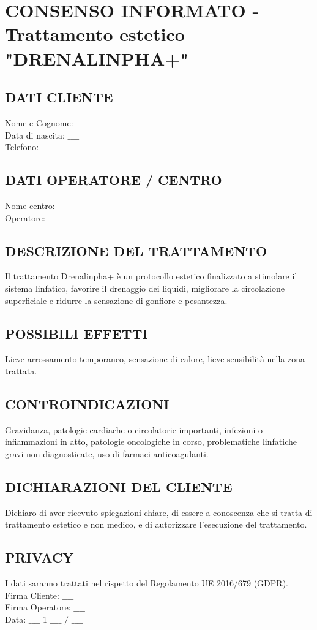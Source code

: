 \newpage

\section{CONSENSO INFORMATO - Trattamento estetico "DRENALINPHA+"}
\subsection{DATI CLIENTE}
\noindent Nome e Cognome: $\_\_\_\_$\\
Data di nascita: $\_\_\_\_$\\
Telefono: $\_\_\_\_$

\subsection{DATI OPERATORE / CENTRO}
\noindent Nome centro: $\_\_\_\_$\\
Operatore: $\_\_\_\_$

\subsection{DESCRIZIONE DEL TRATTAMENTO}
Il trattamento Drenalinpha+ è un protocollo estetico finalizzato a stimolare il sistema linfatico, favorire il drenaggio dei liquidi, migliorare la circolazione superficiale e ridurre la sensazione di gonfiore e pesantezza.

\subsection{POSSIBILI EFFETTI}
Lieve arrossamento temporaneo, sensazione di calore, lieve sensibilità nella zona trattata.

\subsection{CONTROINDICAZIONI}
Gravidanza, patologie cardiache o circolatorie importanti, infezioni o infiammazioni in atto, patologie oncologiche in corso, problematiche linfatiche gravi non diagnosticate, uso di farmaci anticoagulanti.

\subsection{DICHIARAZIONI DEL CLIENTE}
Dichiaro di aver ricevuto spiegazioni chiare, di essere a conoscenza che si tratta di trattamento estetico e non medico, e di autorizzare l'esecuzione del trattamento.

\subsection{PRIVACY}
I dati saranno trattati nel rispetto del Regolamento UE 2016/679 (GDPR).\\
Firma Cliente: $\_\_\_\_$\\
Firma Operatore: $\_\_\_\_$\\
Data: $\_\_\_\_$ 1 $\_\_\_\_$ $/$ $\_\_\_\_$